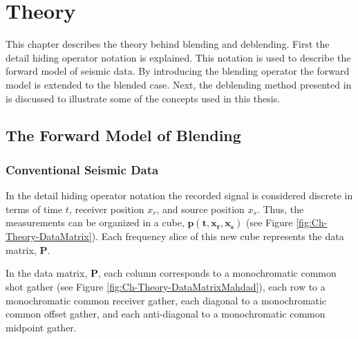 \chapter{Theory} \label{chap:theory}

This chapter describes the theory behind blending and deblending. First the detail hiding operator notation is explained. This notation is used to describe the forward model of seismic data. By introducing the blending operator the forward model is extended to the blended case. Next, the deblending method presented in \citet{Mahdad-Deblending-Method} is discussed to illustrate some of the concepts used in this thesis.

\section{The Forward Model of Blending} \label{sec:Ch-Theory-Operator}

\subsection{Conventional Seismic Data}
In the detail hiding operator notation \citep{Berkhout1982} the recorded signal is considered discrete in terms of time $t$, receiver position $x_r$, and source position $x_s$. Thus, the measurements can be organized in a cube, $\mathbf{p(t,x_r,x_s)}$ (see Figure \ref{fig:Ch-Theory-DataMatrix}). Each frequency slice of this new cube represents the data matrix, $\mathbf{P}$. 

In the data matrix, $\mathbf{P}$, each column corresponds to a monochromatic common shot gather (see Figure \ref{fig:Ch-Theory-DataMatrixMahdad}), each row to a monochromatic common receiver gather, each diagonal to a monochromatic common offset gather, and each anti-diagonal to a monochromatic common midpoint gather. 

